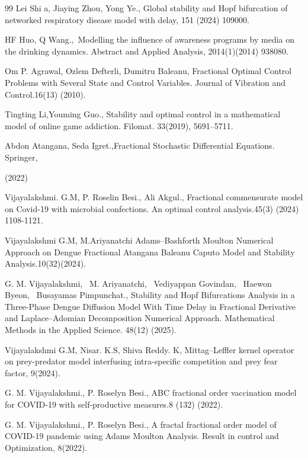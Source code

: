 \documentclass[10pt]{NSP1}
\begin{document}
\begin{thebibliography}{99}
Lei Shi a, Jiaying Zhou, Yong Ye., Global stability and Hopf bifurcation of networked respiratory disease model with delay, 151 (2024) 109000.

HF Huo, Q Wang., Modelling the inﬂuence of awareness programs by media on the drinking dynamics. Abstract and Applied Analysis, 2014(1)(2014) 938080.

Om P. Agrawal, Ozlem Defterli, Dumitru Baleanu, Fractional Optimal Control Problems with Several State and Control Variables. Journal of Vibration and Control.16(13) (2010).

Tingting Li,Youming Guo., Stability and optimal control in a mathematical model of online game addiction. Filomat. 33(2019), 5691–5711.

Abdon Atangana, Seda Igret.,Fractional Stochastic Diﬀerential Equations. Springer,

(2022)

Vijayalakshmi. G.M, P. Roselin Besi., Ali Akgul., Fractional commensurate model on Covid-19 with microbial confections. An optimal control analysis.45(3) (2024) 1108-1121.

Vijayalakshmi G.M, M.Ariyanatchi Adams–Bashforth Moulton Numerical Approach on Dengue Fractional Atangana Baleanu Caputo Model and Stability Analysis.10(32)(2024).

G. M. Vijayalakshmi,  M. Ariyanatchi,  Vediyappan Govindan,  Haewon Byeon,  Busayamas Pimpunchat., Stability and Hopf Bifurcations Analysis in a Three-Phase Dengue Diffusion Model With Time Delay in Fractional Derivative and Laplace–Adomian Decomposition Numerical Approach. Mathematical Methods in the Applied Science. 48(12) (2025).

Vijayalakshmi G.M, Nisar. K.S, Shiva Reddy. K, Mittag–Leffler kernel operator on prey-predator model interfusing intra-specific competition and prey fear factor, 9(2024).

G. M. Vijayalakshmi., P. Roselyn Besi., ABC fractional order vaccination model for COVID-19 with self-productive measures.8 (132) (2022).

G. M. Vijayalakshmi., P. Roselyn Besi., A fractal fractional order model of COVID-19 pandemic using Adams Moulton Analysis. Result in control and Optimization, 8(2022).

\end{thebibliography}
\end{document}
